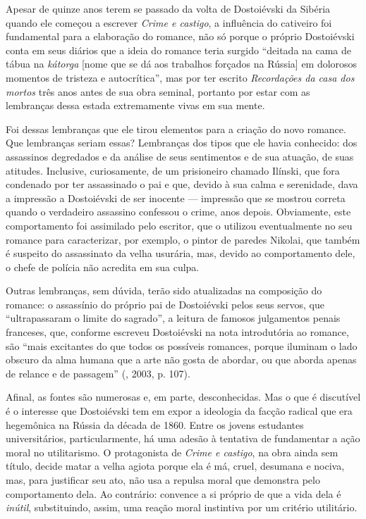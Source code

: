 {{Apesar de quinze anos terem se passado da volta de Dostoiévski da
Sibéria quando ele começou a escrever \emph{Crime e castigo}, a
influência do cativeiro foi fundamental para a elaboração do romance,
não só porque o próprio Dostoiévski conta em seus diários que a ideia do
romance teria surgido ``deitada na cama de tábua na \emph{kátorga}
[nome que se dá aos trabalhos forçados na Rússia] em dolorosos
momentos de tristeza e autocrítica'', mas por ter escrito
\emph{Recordações da casa dos mortos} três anos antes de sua obra
seminal, portanto por estar com as lembranças dessa estada extremamente
vivas em sua mente.

Foi dessas lembranças que ele tirou elementos para a criação do novo
romance. Que lembranças seriam essas? Lembranças dos tipos que ele havia
conhecido: dos assassinos degredados e da análise de seus sentimentos e
de sua atuação, de suas atitudes. Inclusive, curiosamente, de um
prisioneiro chamado Ilínski, que fora condenado por ter assassinado o
pai e que, devido à sua calma e serenidade, dava a impressão a
Dostoiévski de ser inocente --- impressão que se mostrou correta quando o
verdadeiro assassino confessou o crime, anos depois. Obviamente, este
comportamento foi assimilado pelo escritor, que o utilizou eventualmente
no seu romance para caracterizar, por exemplo, o pintor de paredes
Nikolai, que também é suspeito do assassinato da velha usurária, mas,
devido ao comportamento dele, o chefe de polícia não acredita em sua
culpa.

Outras lembranças, sem dúvida, terão sido atualizadas na composição do
romance: o assassínio do próprio pai de Dostoiévski pelos seus servos,
que ``ultrapassaram o limite do sagrado'', a leitura de famosos
julgamentos penais franceses, que, conforme escreveu Dostoiévski na nota
introdutória ao romance, são ``mais excitantes do que todos os possíveis
romances, porque iluminam o lado obscuro da alma humana que a arte não
gosta de abordar, ou que aborda apenas de relance e de passagem'' (, 2003, p. 107).

Afinal, as fontes são numerosas e, em parte, desconhecidas. Mas o que é
discutível é o interesse que Dostoiévski tem em expor a ideologia da
facção radical que era hegemônica na Rússia da década de 1860. Entre os
jovens estudantes universitários, particularmente, há uma adesão à
tentativa de fundamentar a ação moral no utilitarismo. O protagonista de
\emph{Crime e castigo}, na obra ainda sem título, decide matar a velha
agiota porque ela é má, cruel, desumana e nociva, mas, para justificar
seu ato, não usa a repulsa moral que demonstra pelo comportamento dela.
Ao contrário: convence a si próprio de que a vida dela é \emph{inútil},
substituindo, assim, uma reação moral instintiva por um critério
utilitário.

}}
